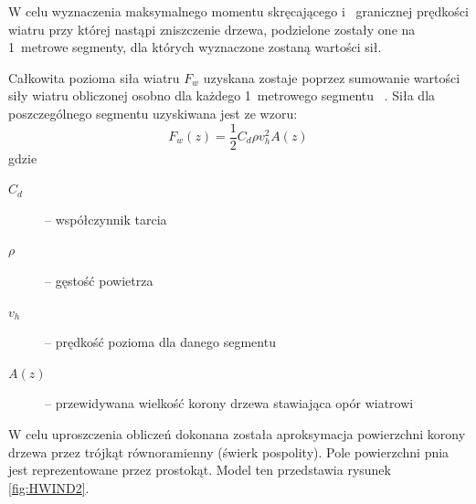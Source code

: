 W celu wyznaczenia maksymalnego momentu skręcającego i ~granicznej prędkości wiatru przy której nastąpi zniszczenie drzewa, podzielone zostały one na 1~metrowe segmenty, dla których wyznaczone zostaną wartości sił.

Całkowita pozioma siła wiatru $F_w$ uzyskana zostaje poprzez sumowanie wartości siły wiatru obliczonej osobno dla każdego 1~metrowego segmentu ~\cite{chm_mgza}. Siła dla poszczególnego segmentu uzyskiwana jest ze wzoru:
\begin{equation}
\label{eq:windForce}
 F_w(z) = \frac{1}{2}C_d  \rho v_h^2 A(z)
\end{equation}
gdzie
\begin{description}
  \item[$C_d$] -- współczynnik tarcia
  \item[$\rho$ ]-- gęstość powietrza
  \item[$v_h$ ]-- prędkość pozioma dla danego segmentu
  \item[$A(z)$]-- przewidywana wielkość korony drzewa stawiająca opór wiatrowi
\end{description}

W celu uproszczenia obliczeń dokonana została aproksymacja powierzchni korony drzewa przez trójkąt równoramienny (świerk pospolity). Pole powierzchni pnia jest reprezentowane przez prostokąt. Model ten przedstawia rysunek \ref{fig:HWIND2}.

